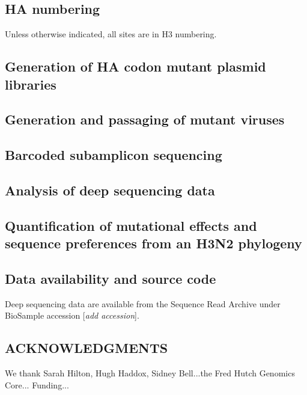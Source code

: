 \documentclass[11pt]{article}
\newcommand{\comment}[1]{{\color{red}[\textsl{#1}]}}
\begin{document}
\subsection*{HA numbering}
Unless otherwise indicated, all sites are in H3 numbering.

\subsection*{Generation of HA codon mutant plasmid libraries}

\subsection*{Generation and passaging of mutant viruses}

\subsection*{Barcoded subamplicon sequencing}

\subsection*{Analysis of deep sequencing data}

\subsection*{Quantification of mutational effects and sequence preferences from an H3N2 phylogeny}

\subsection*{Data availability and source code}
Deep sequencing data are available from the Sequence Read Archive under BioSample accession \comment{add accession}.


\subsection*{ACKNOWLEDGMENTS}
We thank Sarah Hilton, Hugh Haddox, Sidney Bell...the Fred Hutch Genomics Core...
Funding...
\end{document}
